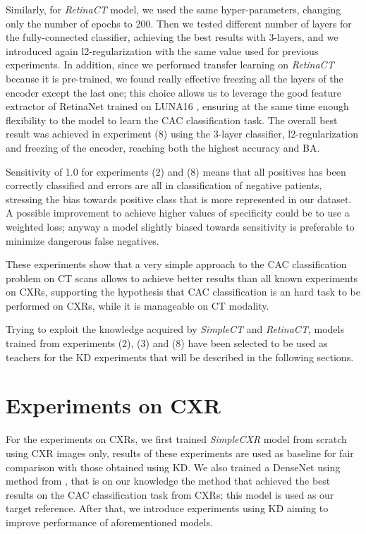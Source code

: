 Similarly, for \emph{RetinaCT} model, we used the same hyper-parameters, changing only the number of epochs to 200.
Then we tested different number of layers for the fully-connected classifier, achieving the best results with 3-layers, and we introduced again l2-regularization with the same value used for previous experiments.
In addition, since we performed transfer learning on \emph{RetinaCT} because it is pre-trained, we found really effective freezing all the layers of the encoder except the last one; this choice allows us to leverage the good feature extractor of RetinaNet \cite{lin2017focal} trained on LUNA16 \cite{luna16}, ensuring at the same time enough flexibility to the model to learn the CAC classification task.
The overall best result was achieved in experiment (8) using the 3-layer classifier, l2-regularization and freezing of the encoder, reaching both the highest accuracy and BA.

Sensitivity of 1.0 for experiments (2) and (8) means that all positives has been correctly classified and errors are all in classification of negative patients, stressing the bias towards positive class that is more represented in our dataset.
A possible improvement to achieve higher values of specificity could be to use a weighted loss; anyway a model slightly biased towards sensitivity is preferable to minimize dangerous false negatives.

These experiments show that a very simple approach to the CAC classification problem on CT scans allows to achieve better results than all known experiments on CXRs, supporting the hypothesis that CAC classification is an hard task to be performed on CXRs, while it is manageable on CT modality.

Trying to exploit the knowledge acquired by \emph{SimpleCT} and \emph{RetinaCT}, models trained from experiments (2), (3) and (8) have been selected to be used as teachers for the KD experiments that will be described in the following sections.


\section{Experiments on CXR}\label{sec:experiments_cxr}

For the experiments on CXRs, we first trained \emph{SimpleCXR} model from scratch using CXR images only, results of these experiments are used as baseline for fair comparison with those obtained using KD.
We also trained a DenseNet using method from \cite{iodice_2022}, that is on our knowledge the method that achieved the best results on the CAC classification task from CXRs; this model is used as our target reference.
After that,  we introduce experiments using KD aiming to improve performance of aforementioned models.


